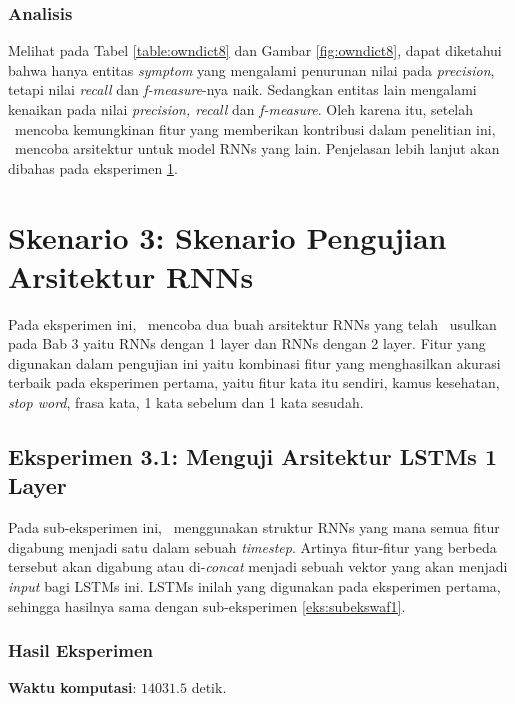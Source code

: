 	\subsubsection{Analisis}
	Melihat pada Tabel \ref{table:owndict8} dan Gambar \ref{fig:owndict8}, dapat diketahui bahwa hanya entitas \textit{symptom} yang mengalami penurunan nilai pada \textit{precision}, tetapi nilai \textit{recall} dan \textit{f-measure}-nya naik. Sedangkan entitas lain mengalami kenaikan pada nilai \textit{precision, recall} dan \textit{f-measure}. Oleh karena itu, setelah \saya~mencoba kemungkinan fitur yang memberikan kontribusi dalam penelitian ini, \saya~mencoba arsitektur untuk model RNNs yang lain. Penjelasan lebih lanjut akan dibahas pada eksperimen \ref{eks:eks2}.
	
	
	
  
  
\section{Skenario 3: Skenario Pengujian Arsitektur RNNs}\label{eks:eks2}
    
    Pada eksperimen ini, \saya~mencoba dua buah arsitektur RNNs yang telah \saya~usulkan pada Bab 3 yaitu RNNs dengan 1 layer dan RNNs dengan 2 layer. Fitur yang digunakan dalam pengujian ini yaitu kombinasi fitur yang menghasilkan akurasi terbaik pada eksperimen pertama, yaitu fitur kata itu sendiri, kamus kesehatan, \textit{stop word}, frasa kata, 1 kata sebelum dan 1 kata sesudah.
    
    \subsection{Eksperimen 3.1: Menguji Arsitektur LSTMs 1 Layer}\label{eks2:subeksrnn1}
    Pada sub-eksperimen ini, \saya~menggunakan struktur RNNs yang mana semua fitur digabung menjadi satu dalam sebuah \textit{timestep}.
    Artinya fitur-fitur yang berbeda tersebut akan digabung atau di-\textit{concat} menjadi sebuah vektor yang akan menjadi \textit{input} bagi LSTMs ini. LSTMs inilah yang digunakan pada eksperimen pertama, sehingga hasilnya sama dengan sub-eksperimen \ref{eks:subekswaf1}.
    
    \subsubsection{Hasil Eksperimen}
    \textbf{Waktu komputasi}: $ 14031.5 $ detik.
    
